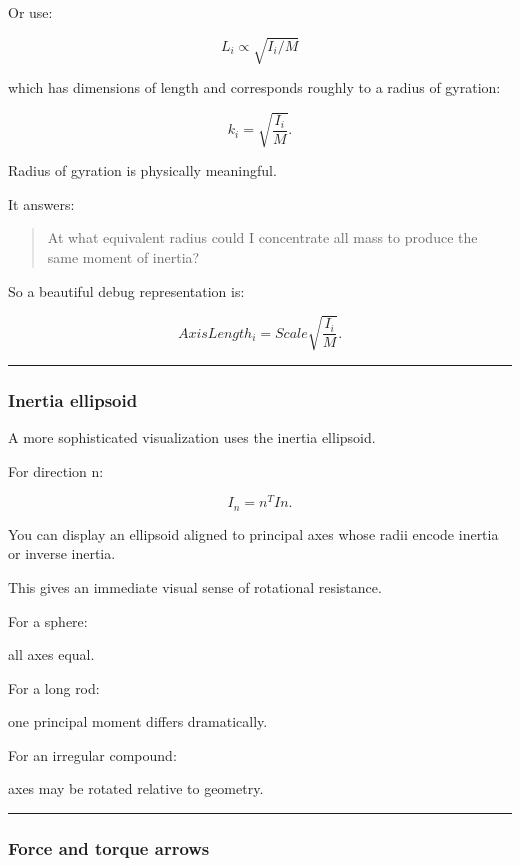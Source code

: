 Or use:

\[
L_i\propto\sqrt{I_i/M}
\]

which has dimensions of length and corresponds roughly to a radius of gyration:

\[
\boxed{
k_i
=
\sqrt{\frac{I_i}{M}}.
}
\]

Radius of gyration is physically meaningful.

It answers:

\begin{quote}
At what equivalent radius could I concentrate all mass to produce the same moment of inertia?
\end{quote}

So a beautiful debug representation is:

\[
AxisLength_i
=
Scale
\sqrt{\frac{I_i}{M}}.
\]

\begin{center}\rule{0.5\linewidth}{0.5pt}\end{center}

\subsubsection{Inertia ellipsoid}\label{inertia-ellipsoid}

A more sophisticated visualization uses the inertia ellipsoid.

For direction n:

\[
I_n=n^TIn.
\]

You can display an ellipsoid aligned to principal axes whose radii encode inertia or inverse inertia.

This gives an immediate visual sense of rotational resistance.

For a sphere:

all axes equal.

For a long rod:

one principal moment differs dramatically.

For an irregular compound:

axes may be rotated relative to geometry.

\begin{center}\rule{0.5\linewidth}{0.5pt}\end{center}

\subsubsection{Force and torque arrows}\label{force-and-torque-arrows}

